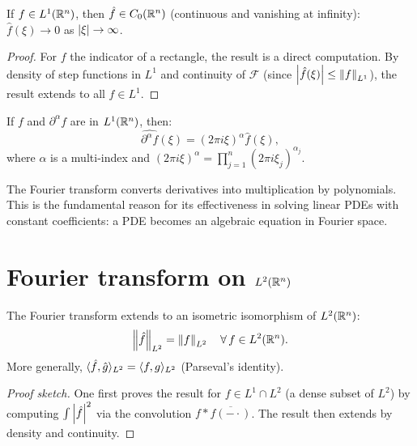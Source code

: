 \begin{theorem}
If $f \in L^1(\mathbb{R}^n)$, then $\hat{f} \in C_0(\mathbb{R}^n)$ (continuous and vanishing at
infinity): $\hat{f}(\xi) \to 0$ as $\left| \xi \right| \to \infty$.
\end{theorem}

\begin{proof}
For $f$ the indicator of a rectangle, the result is a direct computation. By
density of step functions in $L^1$ and continuity of $\mathcal{F}$ (since
$\left| \hat{f}(\xi) \right| \leq \left\| f \right\|_{L^1}$), the result extends to all $f \in L^1$.
\end{proof}

\begin{theorem}
If $f$ and $\partial^\alpha f$ are in $L^1(\mathbb{R}^n)$, then:
\[
    \widehat{\partial^\alpha f}(\xi) = (2\pi i \xi)^\alpha \hat{f}(\xi),
\]
where $\alpha$ is a multi-index and $(2\pi i \xi)^\alpha = \prod_{j=1}^{n}(2\pi i \xi_j)^{\alpha_j}$.
\end{theorem}

\begin{intuition}
The Fourier transform converts derivatives into multiplication by polynomials.
This is the fundamental reason for its effectiveness in solving linear PDEs with
constant coefficients: a PDE becomes an algebraic equation in Fourier space.
\end{intuition}

\section{Fourier transform on $L^2(\mathbb{R}^n)$}

\begin{theorem}[Plancherel]
\label{thm:plancherel}
The Fourier transform extends to an isometric isomorphism of $L^2(\mathbb{R}^n)$:
\[
    \left\| \hat{f} \right\|_{L^2} = \left\| f \right\|_{L^2} \quad \forall\, f \in L^2(\mathbb{R}^n).
\]
More generally, $\langle \hat{f}, \hat{g} \rangle_{L^2} = \langle f, g \rangle_{L^2}$
(Parseval's identity).
\end{theorem}

\begin{proof}[Proof sketch]
One first proves the result for $f \in L^1 \cap L^2$ (a dense subset of $L^2$)
by computing $\int \left| \hat{f} \right|^2$ via the convolution
$f * \overline{f(-\cdot)}$. The result then extends by density and continuity.
\end{proof}

